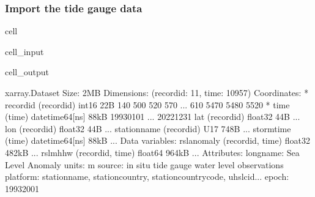 \documentclass[letterpaper,10pt,english]{jupyterBook}
\begin{document}
\subsubsection{Import the tide gauge data}
\label{\detokenize{notebooks/regional_and_local/SL_anomaly_annual:import-the-tide-gauge-data}}
\begin{sphinxuseclass}{cell}\begin{sphinxVerbatimInput}

\begin{sphinxuseclass}{cell_input}
\begin{sphinxVerbatim}[commandchars=\\\{\}]
   


\end{sphinxVerbatim}

\end{sphinxuseclass}\end{sphinxVerbatimInput}
\begin{sphinxVerbatimOutput}

\begin{sphinxuseclass}{cell_output}
\begin{sphinxVerbatim}[commandchars=\\\{\}]
\PYGZlt{}xarray.Dataset\PYGZgt{} Size: 2MB
Dimensions:       (record\PYGZus{}id: 11, time: 10957)
Coordinates:
  * record\PYGZus{}id     (record\PYGZus{}id) int16 22B 140 500 520 570 ... 610 5470 5480 5520
  * time          (time) datetime64[ns] 88kB 1993\PYGZhy{}01\PYGZhy{}01 ... 2022\PYGZhy{}12\PYGZhy{}31
    lat           (record\PYGZus{}id) float32 44B ...
    lon           (record\PYGZus{}id) float32 44B ...
    station\PYGZus{}name  (record\PYGZus{}id) \PYGZlt{}U17 748B ...
    storm\PYGZus{}time    (time) datetime64[ns] 88kB ...
Data variables:
    rsl\PYGZus{}anomaly   (record\PYGZus{}id, time) float32 482kB ...
    rsl\PYGZus{}mhhw      (record\PYGZus{}id, time) float64 964kB ...
Attributes:
    long\PYGZus{}name:  Sea Level Anomaly
    units:      m
    source:     in situ tide gauge water level observations
    platform:   station\PYGZus{}name, station\PYGZus{}country, station\PYGZus{}country\PYGZus{}code, uhslc\PYGZus{}id...
    epoch:      1993\PYGZhy{}2001
\end{sphinxVerbatim}

\end{sphinxuseclass}\end{sphinxVerbatimOutput}

\end{sphinxuseclass}
\end{document}
